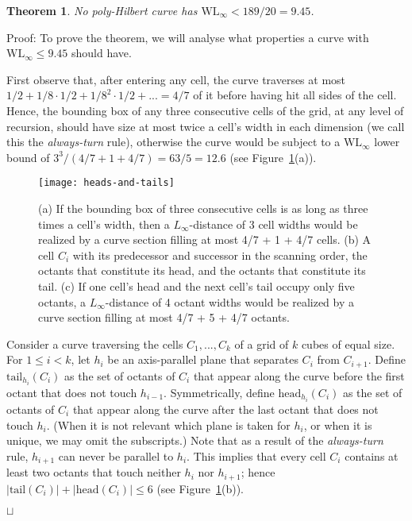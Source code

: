 \documentclass[11pt,a4paper]{article}
\def\WLMax{\ensuremath{\mathrm{WL}_\infty}\xspace}
\def\tail{\ensuremath{\mathrm{tail}}\xspace}
\def\head{\ensuremath{\mathrm{head}}\xspace}
\newtheorem{theorem}{Theorem}
\newenvironment{proof}{Proof:}{\qed}
\def\squareforqed{\hbox{\rlap{$\sqcap$}$\sqcup$}}
\def\qed{\ifmmode\squareforqed\else{\unskip\nobreak\hfil
\penalty50\hskip1em\null\nobreak\hfil\squareforqed
\parfillskip=0pt\finalhyphendemerits=0\endgraf}\fi}
\begin{document}
\begin{theorem}\label{th:WLMaxlbd}
No poly-Hilbert curve has $\WLMax < 189/20 = 9.45$.
\end{theorem}
\begin{proof}
To prove the theorem, we will analyse what properties a curve with $\WLMax \leq 9.45$ should have.

First observe that, after entering any cell, the curve traverses at most $1/2 + 1/8\cdot 1/2 + 1/8^2 \cdot 1/2 + ... = 4/7$ of it before having hit all sides of the cell. Hence, the bounding box of any three consecutive cells of the grid, at any level of recursion, should have size at most twice a cell's width in each dimension (we call this the \emph{always-turn} rule), otherwise the curve would be subject to a \WLMax lower bound of $3^3 / (4/7 + 1 + 4/7) = 63 / 5 = 12.6$ (see Figure~\ref{fig:WLMaxlbd}(a)).

\begin{figure}
\centering
\texttt{[image: heads-and-tails]}
\caption{(a) If the bounding box of three consecutive cells is as long as three times a cell's width, then a $L_\infty$-distance of 3 cell widths would be realized by a curve section filling at most 4/7 + 1 + 4/7 cells.\quad
(b) A cell $C_i$ with its predecessor and successor in the scanning order, the octants that constitute its head, and the octants that constitute its tail.\quad
(c) If one cell's head and the next cell's tail occupy only five octants, a $L_\infty$-distance of 4 octant widths would be realized by a curve section filling at most 4/7 + 5 + 4/7 octants.}
\label{fig:WLMaxlbd}
\end{figure}

Consider a curve traversing the cells $C_1,...,C_k$ of a grid of $k$ cubes of equal size. For $1 \leq i < k$, let $h_i$ be an axis-parallel plane that separates $C_i$ from $C_{i+1}$. Define $\tail_{h_i}(C_i)$ as the set of octants of $C_i$ that appear along the curve before the first octant that does not touch $h_{i-1}$. Symmetrically, define $\head_{h_i}(C_i)$ as the set of octants of $C_i$ that appear along the curve after the last octant that does not touch $h_i$. (When it is not relevant which plane is taken for $h_i$, or when it is unique, we may omit the subscripts.) Note that as a result of the \emph{always-turn} rule, $h_{i+1}$ can never be parallel to $h_i$. This implies that every cell $C_i$ contains at least two octants that touch neither $h_i$ nor $h_{i+1}$; hence $|\tail(C_i)| + |\head(C_i)| \leq 6$ (see Figure~\ref{fig:WLMaxlbd}(b)).


\end{proof}
\end{document}
